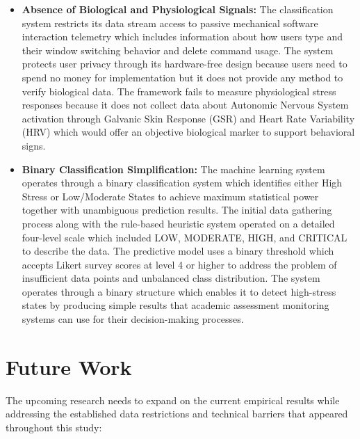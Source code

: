 \begin{itemize}
    \item \textbf{Absence of Biological and Physiological Signals:} The classification system restricts its data stream access to passive mechanical software interaction telemetry which includes information about how users type and their window switching behavior and delete command usage. The system protects user privacy through its hardware-free design because users need to spend no money for implementation but it does not provide any method to verify biological data. The framework fails to measure physiological stress responses because it does not collect data about Autonomic Nervous System activation through Galvanic Skin Response (GSR) and Heart Rate Variability (HRV) which would offer an objective biological marker to support behavioral signs.

    \item \textbf{Binary Classification Simplification:} The machine learning system operates through a binary classification system which identifies either High Stress or Low/Moderate States to achieve maximum statistical power together with unambiguous prediction results. The initial data gathering process along with the rule-based heuristic system operated on a detailed four-level scale which included LOW, MODERATE, HIGH, and CRITICAL to describe the data. The predictive model uses a binary threshold which accepts Likert survey scores at level 4 or higher to address the problem of insufficient data points and unbalanced class distribution. The system operates through a binary structure which enables it to detect high-stress states by producing simple results that academic assessment monitoring systems can use for their decision-making processes.
\end{itemize}

\section{Future Work}
\label{sec:future_work}
The upcoming research needs to expand on the current empirical results while addressing the established data restrictions and technical barriers that appeared throughout this study:

